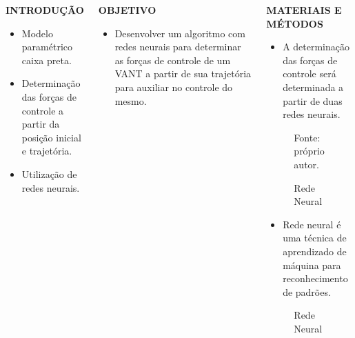 \documentclass[serif,20pt]{beamer}
\begin{document}
\begin{frame}[t]
\begin{columns}[t]
\begin{block}{\centering\bfseries INTRODUÇÃO}
\vspace{1cm}
\begin{itemize}\justifying
    \item Modelo paramétrico caixa preta.
    \item Determinação das forças de controle a partir da posição inicial e trajetória.
    \item Utilização de redes neurais.
\end{itemize}
\vspace{1cm}
\end{block}
%
\begin{block}{\centering\bfseries OBJETIVO}
\vspace{1cm}
\begin{itemize}\justifying
    \item Desenvolver um algoritmo com redes neurais para determinar as forças de controle de um VANT a partir de sua trajetória para auxiliar no controle do mesmo.
\end{itemize}
\vspace{1cm}
\end{block}
%
\begin{block}{\centering\bfseries MATERIAIS E MÉTODOS}
    \vspace{1cm}
\begin{itemize}\justifying
    \item A determinação das forças de controle será determinada a partir de duas redes neurais.
\end{itemize}
%
\begin{figure}[H]
    \centering
    \caption{Rede Neural}
    

    {\footnotesize Fonte: próprio autor.}
    \label{fig:rede_neural}
\end{figure}
\begin{itemize}\justifying
    \item Rede neural é uma técnica de aprendizado de máquina para reconhecimento de padrões.\cite{haykin1999}
\end{itemize}
\begin{figure}
    \centering
    \caption{Rede Neural}
    
\end{figure}


\end{block}
\end{columns}
\end{frame}
\end{document}
